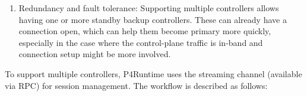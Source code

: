 \documentclass[11pt]{article}
\begin{document}
{\begin{enumerate}
\item{}
Redundancy and fault tolerance: Supporting multiple controllers allows having
one or more standby backup controllers. These can already have a connection
open, which can help them become primary more quickly, especially in the case
where the control-plane traffic is in-band and connection setup might be more
involved.%
\end{enumerate}%

\noindent{}To support multiple controllers, P4Runtime uses the streaming channel (available
via  RPC) for session management. The workflow is described as
follows:%

\begin{itemize}%


\end{itemize}}
\end{document}
